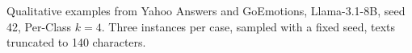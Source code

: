 \begin{table}[t]
  \centering
  \scriptsize
  \setlength{\tabcolsep}{2pt}
  
  \caption{Qualitative examples from Yahoo Answers and GoEmotions, Llama-3.1-8B, seed 42, Per-Class $k = 4$. Three instances per case, sampled with a fixed seed, texts truncated to 140 characters.}
  \label{tab:examples}
\end{table}
